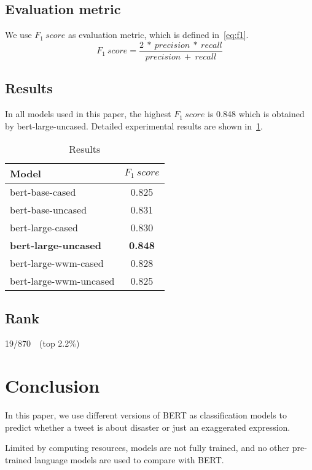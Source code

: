 \documentclass{amsart}
\begin{document}
\subsection{Evaluation metric}
We use ${F_1\ score}$ as evaluation metric, which is defined in~\cref{eq:f1}.
\begin{equation}\label{eq:f1}
    {F_1\ score} = \frac{2\ *\ precision\ *\ recall}{precision\ +\ recall}
\end{equation}


\subsection{Results}
In all models used in this paper, the highest ${F_1\ score}$ is 0.848 which is obtained by bert-large-uncased. Detailed experimental results are shown in~\cref{tbl:results}.
\begin{table}  
    \centering
    \caption{Results}
    \label{tbl:results}
\begin{tabular}{ l  c }
    \toprule
    Model   & ${F_1\ score}$ \\
    \midrule
    bert-base-cased   & 0.825    \\
	bert-base-uncased     & 0.831       \\
	bert-large-cased         & 0.830     \\
	\bf{bert-large-uncased}   & \bf{0.848}      \\
	bert-large-wwm-cased         & 0.828    \\
	bert-large-wwm-uncased        & 0.825      \\
    \bottomrule
\end{tabular}
\end{table}

\subsection{Rank}
19/870\ \ (top 2.2$\%$)



\section{Conclusion} \label{sec-conclusion}
In this paper, we use different versions of BERT as classification models to predict whether a tweet is about disaster or just an exaggerated expression.

Limited by computing resources, models are not fully trained, and no other pre-trained language models are used to compare with BERT.
\end{document}
